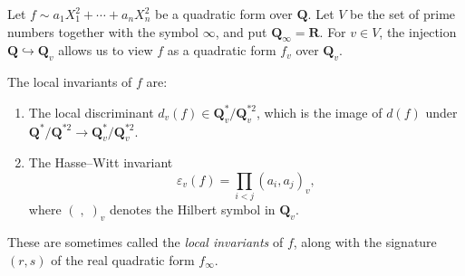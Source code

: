 Let $f \sim a_1 X_1^2 + \cdots + a_n X_n^2$ be a quadratic form over $\mathbf{Q}$. Let $V$ be the set of prime numbers together with the symbol $\infty$, and put $\mathbf{Q}_\infty = \mathbf{R}$. For $v \in V$, the injection $\mathbf{Q} \hookrightarrow \mathbf{Q}_v$ allows us to view $f$ as a quadratic form $f_v$ over $\mathbf{Q}_v$.

The local invariants of $f$ are:

\begin{enumerate}
\item The local discriminant $d_v(f) \in \mathbf{Q}_v^*/\mathbf{Q}_v^{*2}$, which is the image of $d(f)$ under $\mathbf{Q}^*/\mathbf{Q}^{*2} \to \mathbf{Q}_v^*/\mathbf{Q}_v^{*2}$.
\item The Hasse–Witt invariant
$$\varepsilon_v(f) = \prod_{i < j} (a_i, a_j)_v,$$
where $(\;,\;)_v$ denotes the Hilbert symbol in $\mathbf{Q}_v$.
\end{enumerate}

These are sometimes called the \textit{local invariants} of $f$, along with the signature $(r,s)$ of the real quadratic form $f_\infty$.
